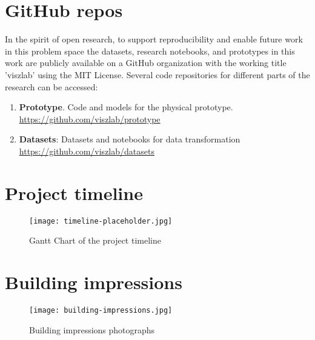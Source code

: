 \newpage

\appendix

\begin{appendices}


\section{GitHub repos}

In the spirit of open research, to support reproducibility and enable future work in this problem space the datasets, research notebooks, and prototypes in this work are publicly available on a GitHub organization with the working title 'viszlab' using the MIT License. Several code repositories for different parts of the research can be accessed:

\begin{enumerate}
  \item \textbf{Prototype}. Code and models for the physical prototype.\\
  \underline{https://github.com/viszlab/prototype}
  \item \textbf{Datasets}: Datasets and notebooks for data transformation  \\
  \underline{https://github.com/viszlab/datasets}
\end{enumerate}


\section{Project timeline}
\label{appendix:timeline}

\begin{figure}[H]
    \centering
    \captionsetup{justification=centering}
    \texttt{[image: timeline-placeholder.jpg]}
    \caption{Gantt Chart of the project timeline}
    \label{fig:timeline}
\end{figure}

\section{Building impressions}
\label{appendix:building}

\begin{figure}[H]
    \centering
    \captionsetup{justification=centering}
    \texttt{[image: building-impressions.jpg]}
    \caption{Building impressions photographs}
    \label{fig:building}
\end{figure}

\end{appendices}